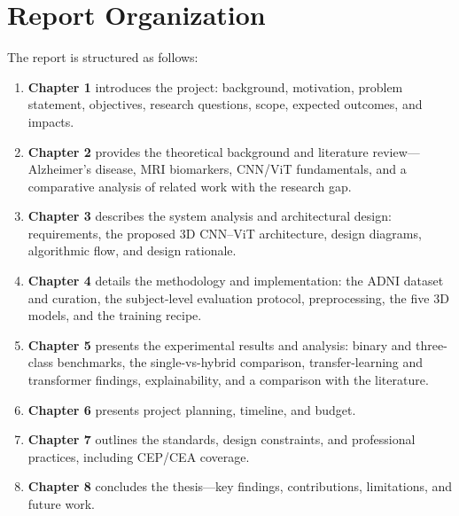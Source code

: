 \section{Report Organization}
The report is structured as follows:
\begin{enumerate}
    \item \textbf{Chapter 1} introduces the project: background, motivation, problem statement, objectives, research questions, scope, expected outcomes, and impacts.
    \item \textbf{Chapter 2} provides the theoretical background and literature review—Alzheimer's disease, MRI biomarkers, CNN/ViT fundamentals, and a comparative analysis of related work with the research gap.
    \item \textbf{Chapter 3} describes the system analysis and architectural design: requirements, the proposed 3D CNN–ViT architecture, design diagrams, algorithmic flow, and design rationale.
    \item \textbf{Chapter 4} details the methodology and implementation: the ADNI dataset and curation, the subject-level evaluation protocol, preprocessing, the five 3D models, and the training recipe.
    \item \textbf{Chapter 5} presents the experimental results and analysis: binary and three-class benchmarks, the single-vs-hybrid comparison, transfer-learning and transformer findings, explainability, and a comparison with the literature.
    \item \textbf{Chapter 6} presents project planning, timeline, and budget.
    \item \textbf{Chapter 7} outlines the standards, design constraints, and professional practices, including CEP/CEA coverage.
    \item \textbf{Chapter 8} concludes the thesis—key findings, contributions, limitations, and future work.
\end{enumerate}
